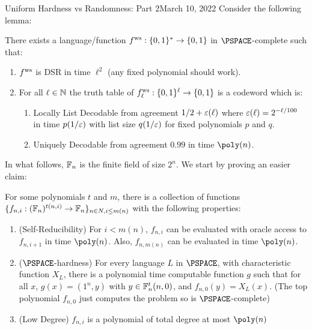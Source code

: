 \begin{lecture}{8}{Uniform Hardness vs Randomness: Part 2}{March 10, 2022}
Consider the following lemma:
\begin{lemma}\label{lem:DSR-ECC-func}
	There exists a language/function $ f^{\text{ws}}  :\{0,1\}^* \rightarrow \{0,1\}$ in $\PSPACE$-complete such that:
	\begin{enumerate}
		\item $ f^{\text{ws}} $ is DSR in time ${\ell}^2$ (any fixed polynomial should work).
		\item For all $\ell \in \mathbb{N}$ the truth table of $ f^{\text{ws}} _{\ell} : \{0,1\}^\ell \rightarrow \{0,1\}$ is a codeword
		which is:
		\begin{enumerate}
			\item Locally List Decodable from agreement $1/2 + \varepsilon(\ell)$ where $\varepsilon(\ell) = 2^{-\ell /
				100}$ in time $p(1/\varepsilon)$ with list size $q(1 / \varepsilon)$ for fixed polynomials $p$ and $q$.
			\item Uniquely Decodable from agreement $0.99$ in time $\poly(n)$.
		\end{enumerate}
	\end{enumerate}
\end{lemma}

In what follows, $\mathbb{F}_n$ is the finite field of size $2^n$. We start by proving an easier claim:
\begin{claim}\label{clm:USR-func-fam}
	For some polynomials $t$ and $m$, there is a collection of functions \\ $\{f_{n,i} : (\mathbb{F}_n)^{t(n,i)} \rightarrow \mathbb{F}_n\}_{n \in N,i \leq m(n)}$ with the following properties:
	\begin{enumerate}
		\item (Self-Reducibility) For $i < m(n)$, $f_{n,i}$ can be evaluated with oracle access	to $f_{n,i+1}$ in time $\poly(n)$. Also, $f_{n,m(n)}$ can be evaluated in time $\poly(n)$.
		\item ($\PSPACE$-hardness)  For every language $L$ in $\PSPACE$, with characteristic function $X_L$, there is a polynomial time computable function $g$ such that for all $x$, $g(x) = (1^n, y)$ with $y \in \mathbb{F}_n^t(n,0)$, and $f_{n,0}(y) = X_L(x)$. (The top polynomial $f_{n,0}$ just computes the problem so is $\PSPACE$-complete)
		\item (Low Degree) $f_{n,i}$ is a polynomial of total degree at most $\poly(n)$
	\end{enumerate}
\end{claim}


\end{lecture}
